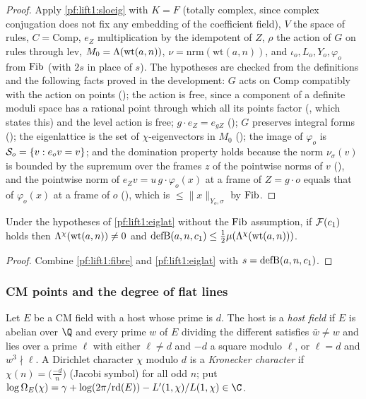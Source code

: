 \begin{proof}
Apply \cref{pf:lift1:sloeig} with $K=F$ (totally complex, since complex conjugation does not fix any
embedding of the coefficient field), $V$ the space of rules, $C=\mathrm{Comp}$, $e_Z$ multiplication by
the idempotent of $Z$, $\rho$ the action of $G$ on rules through $\mathrm{lev}$,
$M_0=\Lambda(\mathrm{wt}(a,n))$, $\nu=\mathrm{nrm}(\mathrm{wt}(a,n))$, and $\iota_o,L_o,Y_o,\varphi_o$
from $\mathrm{Fib}$ (with $2s$ in place of $s$). The hypotheses are checked from the definitions
and the following facts proved in the development: $G$ acts on $\mathrm{Comp}$ compatibly with the
action on points (); the action is free, since a
component of a definite moduli space has a rational point through which all its points factor
(, which states this) and the level action is free;
$g\cdot e_Z=e_{gZ}$ (); $G$ preserves integral forms
(); the eigenlattice is the set of $\chi$-eigenvectors
in $M_0$ (); the image of $\varphi_o$ is
$\mathcal S_o=\{v:e_ov=v\}$; and the domination property holds because the norm $\nu_\sigma(v)$ is
bounded by the supremum over the frames $z$ of the pointwise norms of $v$
(), and the pointwise norm of
$e_Zv=u\,g\cdot\varphi_o(x)$ at a frame of $Z=g\cdot o$ equals that of $\varphi_o(x)$ at a frame of $o$
(), which is $\le\|x\|_{Y_o,\sigma}$ by
$\mathrm{Fib}$.
\end{proof}

\begin{corollary}\label{pf:lift1:eigdef}
Under the hypotheses of \cref{pf:lift1:eiglat} without the $\mathrm{Fib}$ assumption, if
$\mathcal F(c_1)$ holds then $\Lambda^{\chi}(\mathrm{wt}(a,n))\ne0$ and
$\mathrm{defB}(a,n,c_1)\le\frac12\mu(\Lambda^{\chi}(\mathrm{wt}(a,n)))$.
\end{corollary}

\begin{proof}
Combine \cref{pf:lift1:fibre} and \cref{pf:lift1:eiglat} with $s=\mathrm{defB}(a,n,c_1)$.
\end{proof}

\subsubsection*{CM points and the degree of flat lines}
Let $E$ be a CM field with a host whose prime is $d$. The host is a \emph{host field} if $E$ is abelian over
$\Q$ and every prime $w$ of $E$ dividing the different satisfies $\bar w\ne w$ and lies over a prime
$\ell$ with either $\ell\ne d$ and $-d$ a square modulo $\ell$, or $\ell=d$ and $w^3\nmid\ell$. A Dirichlet
character $\chi$ modulo $d$ is a \emph{Kronecker character} if $\chi(n)=\bigl(\frac{-d}n\bigr)$ (Jacobi
symbol) for all odd $n$; put
$\liftonelogOm_E(\chi)=\gamma+\log(2\pi/\liftonerd(E))-L'(1,\chi)/L(1,\chi)\in\C$.


